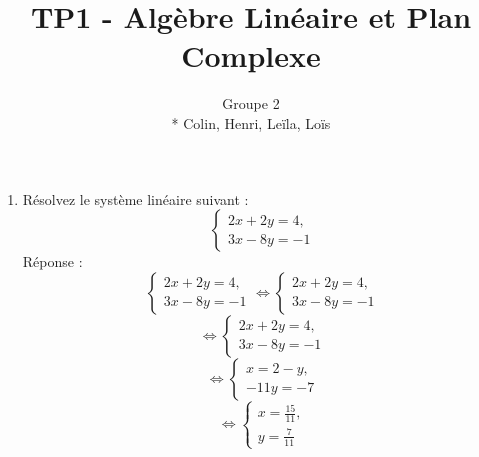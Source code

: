 \documentclass[a4paper,12pt]{article}
\title{TP1 - Algèbre Linéaire et Plan Complexe}
\author{Groupe 2 \\* Colin, Henri, Leïla, Loïs}
\begin{document}
\maketitle



\begin{enumerate}
    \item Résolvez le système linéaire suivant :
\[
\begin{cases}
2x + 2y = 4,\\[1mm]
3x - 8y  = -1 
\end{cases}
\]
Réponse :
\[
\begin{cases}
2x + 2y = 4,\\[1mm]
3x - 8y  = -1 
\end{cases}
\Leftrightarrow 
\begin{cases}
2x + 2y = 4,\\[1mm]
3x - 8y  = -1 
\end{cases}
\]
\[
\Leftrightarrow 
\begin{cases}
2x + 2y = 4,\\[1mm]
3x - 8y  = -1 
\end{cases}
\]
\[
\Leftrightarrow 
\begin{cases}
x = 2 - y,\\[1mm]
-11y = -7  
\end{cases}
\]
\[
\Leftrightarrow
\boxed{
\begin{cases}
x = \frac{15}{11}, \\[1mm]
y = \frac{7}{11}
\end{cases}
}
\]\\



\end{enumerate}
\end{document}
